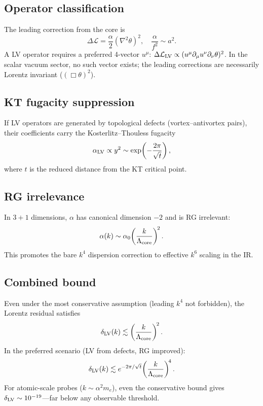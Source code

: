 ﻿\documentclass[a4paper,12pt]{article}
\begin{document}
\subsection{Operator classification}

The leading correction from the core is
\begin{equation}
  \Delta\mathcal{L} = \frac{\alpha}{2}(\nabla^2\theta)^2,\quad
  \frac{\alpha}{f^2}\sim a^2.
\end{equation}
A LV operator requires a preferred 4-vector $u^\mu$:
$\Delta\mathcal{L}_{\rm LV}\propto
(u^\mu\partial_\mu u^\nu\partial_\nu\theta)^2$.
In the scalar vacuum sector, no such vector exists; the leading
corrections are necessarily Lorentz invariant ($(\Box\theta)^2$).

\subsection{KT fugacity suppression}

If LV operators are generated by topological defects (vortex--antivortex
pairs), their coefficients carry the Kosterlitz--Thouless fugacity
\begin{equation}
  \alpha_{\rm LV} \propto y^2
    \sim \exp\!\left(-\frac{2\pi}{\sqrt{t}}\right),
\end{equation}
where $t$ is the reduced distance from the KT critical point.

\subsection{RG irrelevance}

In $3{+}1$ dimensions, $\alpha$ has canonical dimension $-2$ and is
RG irrelevant:
\begin{equation}
  \alpha(k) \sim \alpha_0\!\left(\frac{k}{\Lambda_{\rm core}}\right)^{\!2}.
\end{equation}
This promotes the bare $k^4$ dispersion correction to effective $k^6$
scaling in the IR.

\subsection{Combined bound}

Even under the most conservative assumption (leading $k^4$ not
forbidden), the Lorentz residual satisfies
\begin{equation}
  \delta_{\rm LV}(k) \lesssim
    \left(\frac{k}{\Lambda_{\rm core}}\right)^{\!2}.
  \label{eq:lv_cons}
\end{equation}
In the preferred scenario (LV from defects, RG improved):
\begin{equation}
  \delta_{\rm LV}(k) \lesssim
    e^{-2\pi/\sqrt{t}}
    \!\left(\frac{k}{\Lambda_{\rm core}}\right)^{\!4}.
  \label{eq:lv_pref}
\end{equation}
For atomic-scale probes ($k\sim\alpha^2 m_e$), even the
conservative bound gives $\delta_{\rm LV}\sim 10^{-19}$---far below
any observable threshold.
\end{document}
